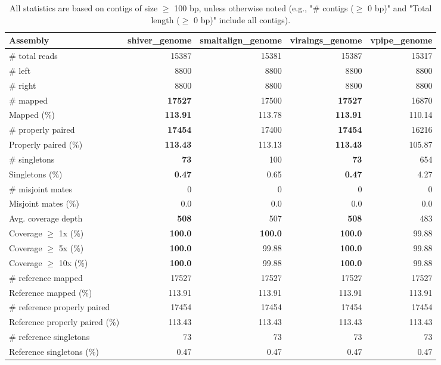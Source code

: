 \documentclass[12pt,a4paper]{article}
\begin{document}
\begin{table}[ht]
\begin{center}
\caption{All statistics are based on contigs of size $\geq$ 100 bp, unless otherwise noted (e.g., "\# contigs ($\geq$ 0 bp)" and "Total length ($\geq$ 0 bp)" include all contigs).}
\begin{tabular}{|l*{4}{|r}|}
\hline
Assembly & shiver\_genome & smaltalign\_genome & viralngs\_genome & vpipe\_genome \\ \hline
\# total reads & 15387 & 15381 & 15387 & 15317 \\ \hline
\# left & 8800 & 8800 & 8800 & 8800 \\ \hline
\# right & 8800 & 8800 & 8800 & 8800 \\ \hline
\# mapped & {\bf 17527} & 17500 & {\bf 17527} & 16870 \\ \hline
Mapped (\%) & {\bf 113.91} & 113.78 & {\bf 113.91} & 110.14 \\ \hline
\# properly paired & {\bf 17454} & 17400 & {\bf 17454} & 16216 \\ \hline
Properly paired (\%) & {\bf 113.43} & 113.13 & {\bf 113.43} & 105.87 \\ \hline
\# singletons & {\bf 73} & 100 & {\bf 73} & 654 \\ \hline
Singletons (\%) & {\bf 0.47} & 0.65 & {\bf 0.47} & 4.27 \\ \hline
\# misjoint mates & 0 & 0 & 0 & 0 \\ \hline
Misjoint mates (\%) & 0.0 & 0.0 & 0.0 & 0.0 \\ \hline
Avg. coverage depth & {\bf 508} & 507 & {\bf 508} & 483 \\ \hline
Coverage $\geq$ 1x (\%) & {\bf 100.0} & {\bf 100.0} & {\bf 100.0} & 99.88 \\ \hline
Coverage $\geq$ 5x (\%) & {\bf 100.0} & 99.88 & {\bf 100.0} & 99.88 \\ \hline
Coverage $\geq$ 10x (\%) & {\bf 100.0} & 99.88 & {\bf 100.0} & 99.88 \\ \hline
\# reference mapped & 17527 & 17527 & 17527 & 17527 \\ \hline
Reference mapped (\%) & 113.91 & 113.91 & 113.91 & 113.91 \\ \hline
\# reference properly paired & 17454 & 17454 & 17454 & 17454 \\ \hline
Reference properly paired (\%) & 113.43 & 113.43 & 113.43 & 113.43 \\ \hline
\# reference singletons & 73 & 73 & 73 & 73 \\ \hline
Reference singletons (\%) & 0.47 & 0.47 & 0.47 & 0.47 \\ \hline

\end{tabular}
\end{center}
\end{table}
\end{document}
